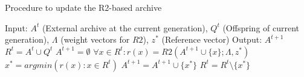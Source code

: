 \begin{algorithm}[!t]
        \caption{Procedure to update the R2-based archive}
        \begin{small}
\begin{algorithmic}[1]
	\STATE Input: $A^t$ (External archive at the current generation), $Q^t$ (Offspring of current generation), $\Lambda$ (weight vectors for $R2$), $z^*$ (Reference vector)
	\STATE Output: $A^{t+1}$
	\STATE $R^t= A^t \cup Q^t$
	\STATE $A^{t+1} = \emptyset$
	\STATE $\forall x \in R^t : r(x) = R2(A^{t+1} \cup \{x\}; \Lambda, z^*)$
	\STATE $x^* = argmin(r(x):x \in R^t)$ 
	\STATE $A^{t+1} = A^{t+1} \cup \{x^*\}$
	\STATE $R^t = R^t \setminus \{ x^* \}$ 
  	\ENDWHILE
        \end{algorithmic}
        \end{small}
\label{alg:r2_Indicator}
\end{algorithm}
